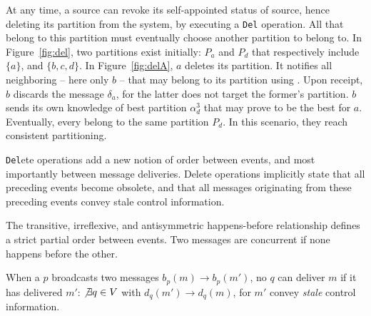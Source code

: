 At any time, a source can revoke its self-appointed status of source,
hence deleting its partition from the system, by executing a
\texttt{Del} operation. All \processes that belong to this partition
must eventually choose another partition to belong to. In
Figure~\ref{fig:del}, two partitions exist initially: $P_a$ and $P_d$
that respectively include $\{a\}$, and $\{b, c, d\}$. In
Figure~\ref{fig:delA}, \Process $a$ deletes its partition. It notifies
all neighboring \processes -- here only \Process $b$ -- that may
belong to its partition using \NAMEB. Upon receipt, \Process $b$
discards the message $\delta_a$, for the latter does not target the
former's partition. \Process $b$ sends its own knowledge of best
partition $\alpha_d^3$ that may prove to be the best for \Process
$a$. Eventually, every \processes belong to the same partition
$P_d$. In this scenario, they reach consistent partitioning.

\texttt{Del}ete operations add a new notion of order between events,
and most importantly between message deliveries. Delete operations
implicitly state that all preceding events become obsolete, and that
all messages originating from these preceding events convey stale
control information.

\begin{definition}
  The transitive, irreflexive, and antisymmetric happens-before
  relationship defines a strict partial order between events. Two
  messages are concurrent if none happens before the other.
\end{definition}

\begin{definition}
  When a \process $p$ broadcasts two messages $b_p(m) \rightarrow
  b_p(m')$, no \process $q$ can deliver $m$ if it has delivered $m'$:
  $\not\exists q \in V$ with $d_q(m') \rightarrow d_q(m)$, for $m'$
  convey \emph{stale} control information.
\end{definition}




